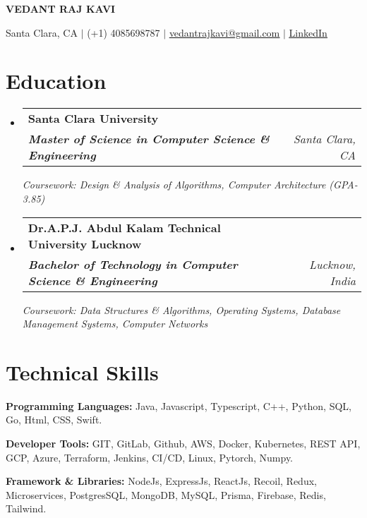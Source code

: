 \documentclass[a4paper,20pt]{article}
\makeatletter
\newcommand{\resumeSubheading}[4]{
  \vspace{-2pt}\item
    \begin{tabular*}{1.0\textwidth}[t]{l@{\extracolsep{\fill}}r}
      \textbf{#1} & \text{\small #2} \\
      \textit{\small#3} & \textit{\small #4} \\
    \end{tabular*}\vspace{-7pt}
}
\newcommand{\resumeSubHeadingListStart}{\begin{itemize}[leftmargin=0.0in, label={}]}
\newcommand{\resumeSubHeadingListEnd}{\end{itemize}}
\makeatother
\begin{document}

\begin{center}
    {\LARGE \scshape \textbf{VEDANT RAJ KAVI}} \\ 
    \vspace{5pt}
    
    Santa Clara, CA $|$ 
    (+1) 4085698787 $|$  
    \href{vkavi@scu.edu}{   \underline{vedantrajkavi@gmail.com}} $|$  
    \href{https://www.linkedin.com/in/vedantrajkavi/}{ \underline{LinkedIn}} 
    
    
    \vspace{-8pt}
\end{center}


\section{Education}
  \resumeSubHeadingListStart
    \resumeSubheading
      {Santa Clara University}{\textbf{\textit{September 2023 - March 2025}}}
      {\textbf {Master of Science in Computer Science \& Engineering }}{Santa Clara, CA}
      
  {\textit{Coursework: Design \& Analysis of Algorithms, Computer Architecture  (GPA-3.85)}}
  
\vspace{2pt}
   
    \resumeSubheading
      {Dr.A.P.J. Abdul Kalam Technical University Lucknow}{\textbf{\textit{August 2018 - June 2022}}}
      {\textbf {Bachelor of Technology in Computer Science \& Engineering}}{Lucknow, India}
      
      {\textit{Coursework: Data Structures \& Algorithms, Operating Systems, Database Management Systems, Computer Networks}}
     
  \resumeSubHeadingListEnd
  \vspace{-12pt}
  
\section{Technical Skills}
\begin{description}
\item {\textbf{Programming Languages: }Java, Javascript, Typescript, C++, Python,  SQL, Go, Html, CSS, Swift.  }
\item {\textbf{Developer Tools: }GIT, GitLab, Github, AWS, Docker, Kubernetes, REST API, GCP, Azure, Terraform, Jenkins, CI/CD, Linux, Pytorch, Numpy.}
\item  {\textbf{Framework \& Libraries: }NodeJs, ExpressJs, ReactJs, Recoil, Redux, Microservices, PostgresSQL, MongoDB, MySQL, Prisma, Firebase, Redis, Tailwind.}
\end{description}
 \vspace{-12pt}
\end{document}
